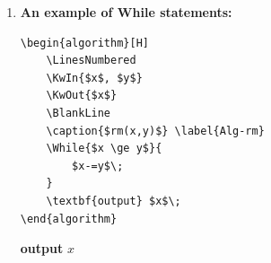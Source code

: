 \documentclass[12pt,a4paper]{article}
\begin{document}
\begin{enumerate}
\begin{minipage}[t]{0.5\textwidth}
\begin{verbatim}
    \uIf{$score \ge 90$}{
        \textbf{output} $A$\;
    }
    \uElseIf{$80 \le score < 90$}{
        \textbf{output} $B$\;
    }
    \Else{
        \textbf{output} $P$\;
    }
\end{algorithm}
\end{verbatim}
        \end{minipage}
        \hspace{2mm}
        \begin{minipage}[t]{0.4\textwidth}
            \begin{algorithm}[H]
                \LinesNumbered
                \BlankLine
                \caption{LetterGrade($score$)} \label{Alg-Score}

            \end{algorithm}
        \end{minipage}

    \item {\color{blue}\textbf{An example of While statements:}}

        \begin{minipage}[t]{0.5\textwidth}
\begin{verbatim}
\begin{algorithm}[H]
    \LinesNumbered
    \KwIn{$x$, $y$}
    \KwOut{$x$}
    \BlankLine
    \caption{$rm(x,y)$} \label{Alg-rm}
    \While{$x \ge y$}{
        $x-=y$\;
    }
    \textbf{output} $x$\;
\end{algorithm}
\end{verbatim}
        \end{minipage}
        \hspace{2mm}
        \begin{minipage}[t]{0.4\textwidth}
            \begin{algorithm}[H]
                \LinesNumbered
                \BlankLine
                \caption{$rm(x,y)$} \label{Alg-rm}
                \textbf{output} $x$\;
            \end{algorithm}
        \end{minipage}


\end{enumerate}
\end{document}
